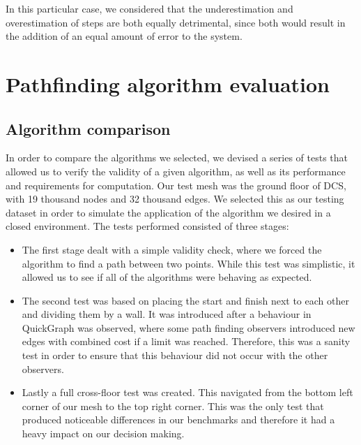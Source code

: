 \documentclass[12pt,a4paper]{report}
\begin{document}
In this particular case, we considered that the underestimation and overestimation of steps are both equally detrimental, since both would result in the addition of an equal amount of error to the system.


\section{Pathfinding algorithm evaluation}

\subsection{Algorithm comparison}
In order to compare the algorithms we selected, we devised a series of tests that allowed us to verify the validity of a given algorithm, as well as its performance and requirements for computation. Our test mesh was the ground floor of DCS, with 19 thousand nodes and 32 thousand edges. We selected this as our testing dataset in order to simulate the application of the algorithm we desired in a closed environment. The tests performed consisted of three stages: 

\begin{itemize}
	\item The first stage dealt with a simple validity check, where we forced the algorithm to find a path between two points. While this test was simplistic, it allowed us to see if all of the algorithms were behaving as expected. 
	\item The second test was based on placing the start and finish next to each other and dividing them by a wall. It was introduced after a behaviour in QuickGraph was observed, where some path finding observers introduced new edges with combined cost if a limit was reached. Therefore, this was a sanity test in order to ensure that this behaviour did not occur with the other observers.
	\item Lastly a full cross-floor test was created. This navigated from the bottom left corner of our mesh to the top right corner. This was the only test that produced noticeable differences in our benchmarks and therefore it had a heavy impact on our decision making.
\end{itemize}
\end{document}
